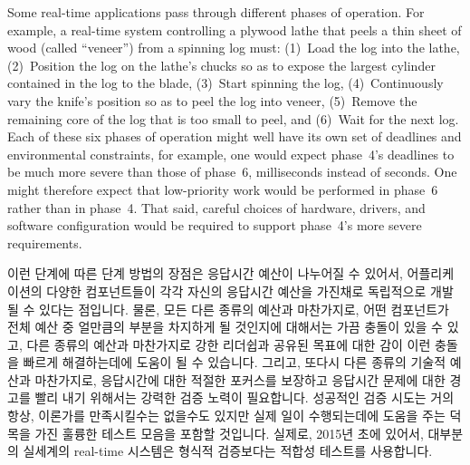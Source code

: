Some real-time applications pass through different phases of operation.
For example, a real-time system controlling a plywood lathe that peels
a thin sheet of wood (called ``veneer'') from a spinning log must:
(1)~Load the log into the lathe,
(2)~Position the log on the lathe's chucks so as to expose the largest
cylinder contained in the log to the blade,
(3)~Start spinning the log,
(4)~Continuously vary the knife's position so as to peel the log into veneer,
(5)~Remove the remaining core of the log that is too small to peel, and
(6)~Wait for the next log.
Each of these six phases of operation might well have its own set of
deadlines and environmental constraints,
for example, one would expect phase~4's deadlines to be much more severe
than those of phase~6, milliseconds instead of seconds.
One might therefore expect that low-priority work would be performed in
phase~6 rather than in phase~4.
That said, careful choices of hardware, drivers, and software configuration
would be required to support phase~4's more severe requirements.
\fi

이런 단계에 따른 단계 방법의 장점은 응답시간 예산이 나누어질 수 있어서,
어플리케이션의 다양한 컴포넌트들이 각각 자신의 응답시간 예산을 가진채로
독립적으로 개발될 수 있다는 점입니다.
물론, 모든 다른 종류의 예산과 마찬가지로, 어떤 컴포넌트가 전체 예산 중 얼만큼의
부분을 차지하게 될 것인지에 대해서는 가끔 충돌이 있을 수 있고, 다른 종류의
예산과 마찬가지로 강한 리더쉽과 공유된 목표에 대한 감이 이런 충돌을 빠르게
해결하는데에 도움이 될 수 있습니다.
그리고, 또다시 다른 종류의 기술적 예산과 마찬가지로, 응답시간에 대한 적절한
포커스를 보장하고 응답시간 문제에 대한 경고를 빨리 내기 위해서는 강력한 검증
노력이 필요합니다.
성공적인 검증 시도는 거의 항상, 이론가를 만족시킬수는 없을수도 있지만 실제 일이
수행되는데에 도움을 주는 덕목을 가진 훌륭한 테스트 모음을 포함할 것입니다.
실제로, 2015년 초에 있어서, 대부분의 실세계의 real-time 시스템은 형식적
검증보다는 적합성 테스트를 사용합니다.

